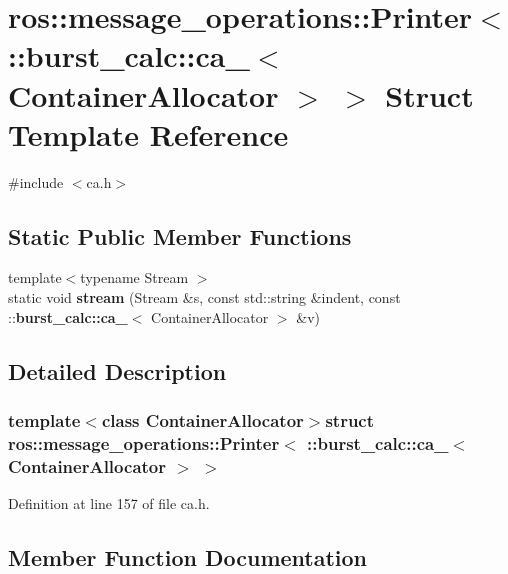 \section{ros\-:\-:message\-\_\-operations\-:\-:\-Printer$<$ \-:\-:burst\-\_\-calc\-:\-:ca\-\_\-$<$ \-Container\-Allocator $>$ $>$ \-Struct \-Template \-Reference}
\label{structros_1_1message__operations_1_1Printer_3_01_1_1burst__calc_1_1ca___3_01ContainerAllocator_01_4_01_4}


{\ttfamily \#include $<$ca.\-h$>$}

\subsection*{\-Static \-Public \-Member \-Functions}
\begin{DoxyCompactItemize}
\item 
{\footnotesize template$<$typename Stream $>$ }\\static void {\bf stream} (\-Stream \&s, const std\-::string \&indent, const \-::{\bf burst\-\_\-calc\-::ca\-\_\-}$<$ \-Container\-Allocator $>$ \&v)
\end{DoxyCompactItemize}


\subsection{\-Detailed \-Description}
\subsubsection*{template$<$class Container\-Allocator$>$struct ros\-::message\-\_\-operations\-::\-Printer$<$ \-::burst\-\_\-calc\-::ca\-\_\-$<$ Container\-Allocator $>$ $>$}



\-Definition at line 157 of file ca.\-h.



\subsection{\-Member \-Function \-Documentation}

